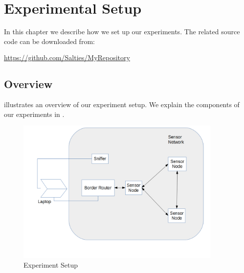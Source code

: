 \chapter{Experimental Setup} \label{Chp: Setup}

In this chapter we describe how we set up our experiments. The related source code can be downloaded from:\\
\begin{center}
	\url{https://github.com/Salties/MyRepository}
\end{center}

\section{Overview}

 illustrates an overview of our experiment setup. We explain the components of our experiments in .

\begin{figure}[h!]
	\center
	\includegraphics[width=0.9\textwidth,]{fig/setup.png}
	\caption{Experiment Setup} \label{Fig: Experiment Setup}
\end{figure}

